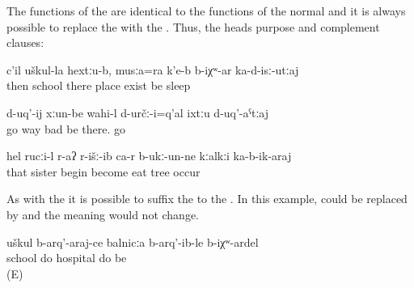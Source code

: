 The functions of the  are identical to the functions of the normal  and it is always possible to replace the  with the . Thus, the  heads purpose and complement clauses:
%
\begin{exe}
	\ex	\label{ex:‎Then there at the school, there is a place, if it still exists, for you to sleep}
	\gll	c'il	uškul-la		hextːu-b,		musːa=ra		k'e-b b-iχʷ-ar				ka-d-isː-utːaj	\\
		then	school	there	place	exist		be	sleep\\
	\glt	{}

	\ex	\label{ex:‎The roads to go there were probably bad, for you to go}
	\gll	d-uq'-ij	xːun-be	wahi-l	d-určː-i=q'al	ixtːu	d-uq'-aˁtːaj\\
		go	way	bad	be	there.	go\\
	\glt	{}

	\ex	\label{ex:‎The sister started to eat up the tree so it would come down}
	\gll	hel	rucːi-l	r-aʔ	r-išː-ib	ca-r	b-ukː-un-ne	kːalkːi	ka-b-ik-araj\\
		that	sister	\tsc{f-}begin	become		eat	tree	occur\\
	\glt	{}
\end{exe}

As with the  it is possible to suffix the   to the  . In this example,  could be replaced by  and the meaning would not change.
%
\begin{exe}
	\ex	\label{ex:‎It would be better to build a hospital instead of building a school}
	\gll	uškul	b-arq'-araj-ce	balnicːa	b-arq'-ib-le	b-iχʷ-ardel\\
		school	do	hospital	do	be\\
	\glt	{} (E)
\end{exe}


